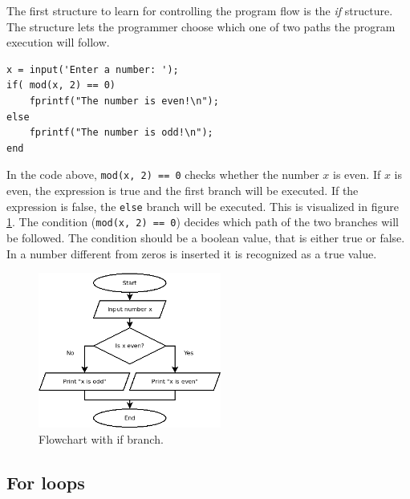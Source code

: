 The first structure to learn for controlling the program flow 
is the \emph{if} structure.
The structure lets the programmer choose which one of two paths the 
program execution will follow.
\begin{lstlisting}
x = input('Enter a number: ');
if( mod(x, 2) == 0)
    fprintf("The number is even!\n");
else
    fprintf("The number is odd!\n");
end\end{lstlisting}
In the code above, \verb!mod(x, 2) == 0! checks whether the number $x$ 
is even. If $x$ is even, the expression is true and the first branch will be 
executed.  If the expression is false, the \verb!else! branch will be executed.
This is visualized in figure \ref{figFlowchartWithIfBranch}.
The condition (\verb!mod(x, 2) == 0!) decides which path of the two branches will be followed.
The condition should be a boolean value, that is either true or false.
In a number different from zeros is inserted it is recognized as a true value.

\begin{figure}
\centering
\includegraphics[width=6cm]{pic/flowchart_simple_branch.png}
\caption{Flowchart with if branch.}
\label{figFlowchartWithIfBranch}
\end{figure}








\subsection{For loops}


